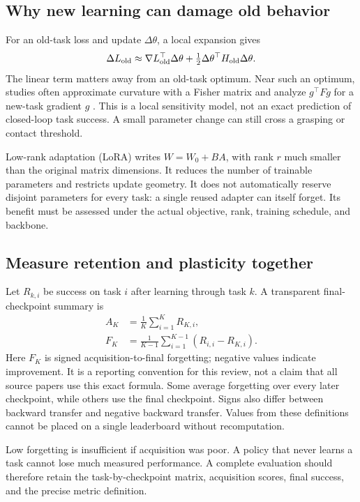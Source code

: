 \documentclass[11pt,a4paper]{article}
\begin{document}
\subsection{Why new learning can damage old behavior}
For an old-task loss and update $\Delta\theta$, a local expansion gives
\begin{equation}
\Delta L_{\rm old}\approx \nabla L_{\rm old}^{\top}\Delta\theta+
\tfrac12\Delta\theta^{\top}H_{\rm old}\Delta\theta.
\label{eq:taylor}
\end{equation}
The linear term matters away from an old-task optimum. Near such an optimum, studies often approximate curvature with a Fisher matrix and analyze $g^{\top}Fg$ for a new-task gradient $g$ \cite{hu_rl,consft}. This is a local sensitivity model, not an exact prediction of closed-loop task success. A small parameter change can still cross a grasping or contact threshold.

Low-rank adaptation (LoRA) writes $W=W_0+BA$, with rank $r$ much smaller than the original matrix dimensions. It reduces the number of trainable parameters and restricts update geometry. It does not automatically reserve disjoint parameters for every task: a single reused adapter can itself forget. Its benefit must be assessed under the actual objective, rank, training schedule, and backbone.

\subsection{Measure retention and plasticity together}
Let $R_{k,i}$ be success on task $i$ after learning through task $k$. A transparent final-checkpoint summary is
\begin{align}
 A_K&=\frac1K\sum_{i=1}^K R_{K,i},\\
 F_K&=\frac1{K-1}\sum_{i=1}^{K-1}(R_{i,i}-R_{K,i}).
\end{align}
Here $F_K$ is signed acquisition-to-final forgetting; negative values indicate improvement. It is a reporting convention for this review, not a claim that all source papers use this exact formula. Some average forgetting over every later checkpoint, while others use the final checkpoint. Signs also differ between backward transfer and negative backward transfer. Values from these definitions cannot be placed on a single leaderboard without recomputation.

Low forgetting is insufficient if acquisition was poor. A policy that never learns a task cannot lose much measured performance. A complete evaluation should therefore retain the task-by-checkpoint matrix, acquisition scores, final success, and the precise metric definition.
\end{document}

